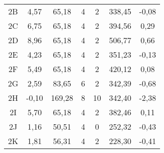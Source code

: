 \begin{table}[h]
\begin{tabular}{c|ccccc|c}
2B               & 4,57             & 65,18         & 4            & 2              & 338,45      & -0,08          \\
2C               & 6,75             & 65,18         & 4            & 2              & 394,56      & 0,29           \\
2D               & 8,96             & 65,18         & 4            & 2              & 506,77      & 0,66           \\
2E               & 4,23             & 65,18         & 4            & 2              & 351,23      & -0,13          \\
2F               & 5,49             & 65,18         & 4            & 2              & 420,12      & 0,08           \\
2G               & 2,59             & 83,65         & 6            & 2              & 342,39      & -0,68          \\
2H               & -0,10            & 169,28        & 8            & 10             & 342,40      & -2,38          \\
2I               & 5,70             & 65,18         & 4            & 2              & 382,46      & 0,11           \\
2J               & 1,16             & 50,51         & 4            & 0              & 252,32      & -0,43          \\
2K               & 1,81             & 56,31         & 4            & 2              & 228,30      & -0,41          \\ \hline
\end{tabular}
\end{table}

\clearpage

